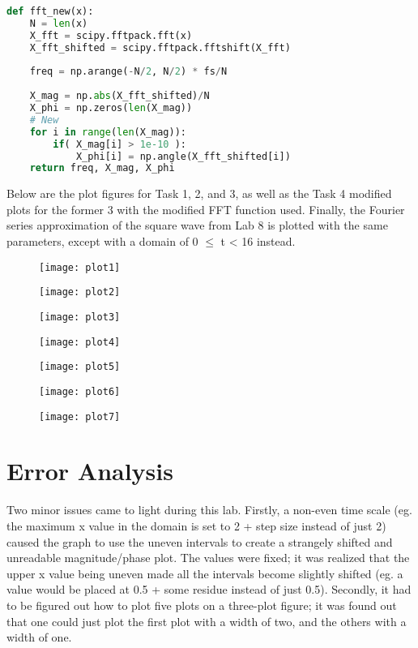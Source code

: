 \documentclass[11pt,a4,titlepage]{article}
\begin{document}
\begin{lstlisting}[language=Python]
def fft_new(x):
	N = len(x)
	X_fft = scipy.fftpack.fft(x)
	X_fft_shifted = scipy.fftpack.fftshift(X_fft)
	
	freq = np.arange(-N/2, N/2) * fs/N
	
	X_mag = np.abs(X_fft_shifted)/N
	X_phi = np.zeros(len(X_mag))
	# New
	for i in range(len(X_mag)):
		if( X_mag[i] > 1e-10 ):
			X_phi[i] = np.angle(X_fft_shifted[i])
	return freq, X_mag, X_phi
\end{lstlisting}

Below are the plot figures for Task 1, 2, and 3, as well as the Task 4 modified plots for the former 3 with the modified FFT function used. Finally, the Fourier series approximation of the square wave from Lab 8 is plotted with the same parameters, except with a domain of 0 $\leq$ t < 16 instead.

\begin{figure}[H]
\centering
\texttt{[image: plot1]}
\end{figure}

\begin{figure}[H]
	\centering
	\texttt{[image: plot2]}
\end{figure}

\begin{figure}[H]
	\centering
	\texttt{[image: plot3]}
\end{figure}

\begin{figure}[H]
	\centering
	\texttt{[image: plot4]}
\end{figure}

\begin{figure}[H]
	\centering
	\texttt{[image: plot5]}
\end{figure}

\begin{figure}[H]
	\centering
	\texttt{[image: plot6]}
\end{figure}

\begin{figure}[H]
	\centering
	\texttt{[image: plot7]}
\end{figure}

\section{Error Analysis}
Two minor issues came to light during this lab. Firstly, a non-even time scale (eg. the maximum x value in the domain is set to 2 + step size instead of just 2) caused the graph to use the uneven intervals to create a strangely shifted and unreadable magnitude/phase plot. The values were fixed; it was realized that the upper x value being uneven made all the intervals become slightly shifted (eg. a value would be placed at 0.5 + some residue instead of just 0.5). Secondly, it had to be figured out how to plot five plots on a three-plot figure; it was found out that one could just plot the first plot with a width of two, and the others with a width of one.
\end{document}
